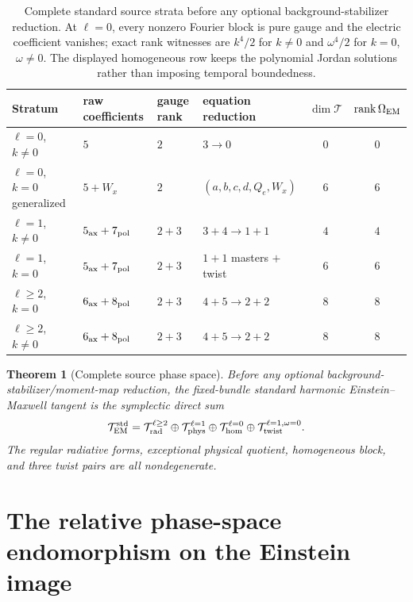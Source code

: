 \documentclass[11pt]{article}
\newtheorem{theorem}{Theorem}[section]
\theoremstyle{remark}
\newcommand{\cT}{\mathcal T}
\newcommand{\rank}{\operatorname{rank}}
\begin{document}
\begin{table}[ht]
\centering
\small
\begin{tabular}{@{}llllcc@{}}
\toprule
Stratum & raw coefficients & gauge rank & equation reduction
  & $\dim\cT$ & $\rank\Omega_{\rm EM}$\\
\midrule
$\ell=0$, $k\neq0$ & $5$ & $2$ & $3\to0$ & $0$ & $0$\\
$\ell=0$, $k=0$ generalized & $5+W_x$ & $2$ & $(a,b,c,d,Q_e,W_x)$
  & $6$ & $6$\\
$\ell=1$, $k\neq0$ & $5_{\rm ax}+7_{\rm pol}$ & $2+3$
  & $3+4\to1+1$ & $4$ & $4$\\
$\ell=1$, $k=0$ & $5_{\rm ax}+7_{\rm pol}$ & $2+3$
  & $1+1$ masters $+$ twist & $6$ & $6$\\
$\ell\geq2$, $k=0$ & $6_{\rm ax}+8_{\rm pol}$ & $2+3$
  & $4+5\to2+2$ & $8$ & $8$\\
$\ell\geq2$, $k\neq0$ & $6_{\rm ax}+8_{\rm pol}$ & $2+3$
  & $4+5\to2+2$ & $8$ & $8$\\
\bottomrule
\end{tabular}
\caption{Complete standard source strata before any optional
background-stabilizer reduction.
At $\ell=0$, every nonzero Fourier block is pure gauge and the electric
coefficient vanishes; exact rank witnesses are $k^4/2$ for $k\neq0$ and
$\omega^4/2$ for $k=0$, $\omega\neq0$. The displayed homogeneous row keeps
the polynomial Jordan solutions rather than imposing temporal boundedness.}
\label{tab:source-strata}
\end{table}

\begin{theorem}[Complete source phase space]\label{thm:source-complete}
Before any optional background-stabilizer/moment-map reduction, the
fixed-bundle standard harmonic
Einstein--Maxwell tangent is the symplectic direct sum
\begin{equation}\label{eq:source-decomp}
 \cT_{\rm EM}^{\rm std}
 =\cT_{\rm rad}^{\ell\geq2}\oplus\cT_{\rm phys}^{\ell=1}
 \oplus\cT_{\rm hom}^{\ell=0}
 \oplus\cT_{\rm twist}^{\ell=1,\omega=0}.
\end{equation}
The regular radiative forms, exceptional physical quotient, homogeneous
block, and three twist pairs are all nondegenerate.
\end{theorem}

\section{The relative phase-space endomorphism on the Einstein image}
\label{sec:restriction}
\end{document}
